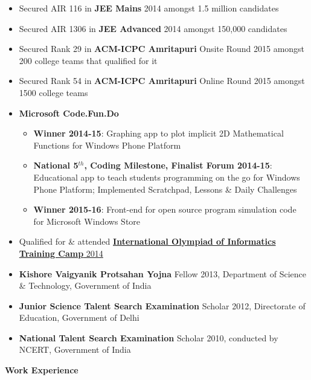\documentclass[letterpaper,11pt]{article}
\begin{document}
{\begin{itemize}
    \item Secured AIR 116 in \textbf{JEE Mains} 2014 amongst 1.5 million candidates
    \item Secured AIR 1306 in \textbf{JEE Advanced} 2014 amongst 150,000 candidates
    \item Secured Rank 29 in \textbf{ACM-ICPC Amritapuri} Onsite Round 2015 amongst 200 college teams that qualified for it
    \item Secured Rank 54 in \textbf{ACM-ICPC Amritapuri} Online Round 2015 amongst 1500 college teams
    \item \textbf{Microsoft Code.Fun.Do}
        \begin{itemize}
            \item \textbf{Winner 2014-15}: Graphing app to plot implicit 2D Mathematical Functions for Windows Phone Platform
            \item \textbf{National 5$^{th}$, Coding Milestone, Finalist Forum 2014-15}: Educational app to teach students programming on the go for Windows Phone Platform; Implemented Scratchpad, Lessons \& Daily Challenges
            \item \textbf{Winner 2015-16}: Front-end for open source program simulation code for Microsoft Windows Store
        \end{itemize}
    \item Qualified for \& attended \href{http://www.iarcs.org.in/inoi/2014/inoi2014/results_inoi2014.php}{\textbf{International Olympiad of Informatics Training Camp} 2014}
    \item \textbf{Kishore Vaigyanik Protsahan Yojna} Fellow 2013, Department of Science \& Technology, Government of India
    \item \textbf{Junior Science Talent Search Examination} Scholar 2012, Directorate of Education, Government of Delhi
    \item \textbf{National Talent Search Examination} Scholar 2010, conducted by NCERT, Government of India
\end{itemize}

\Large{\textbf{Work Experience}}
\small

}
\end{document}
